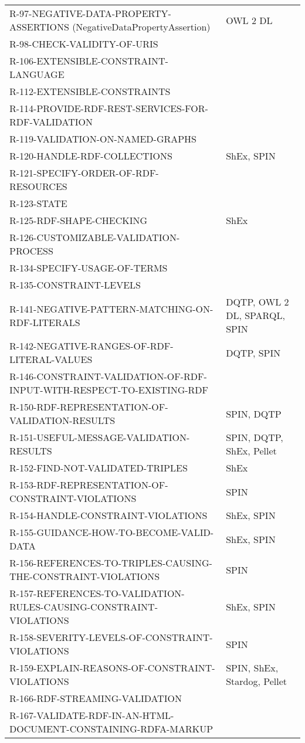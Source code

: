\documentclass{llncs}
\begin{document}
\begin{table}
\begin{tabular}{ll}
R-97-NEGATIVE-DATA-PROPERTY-ASSERTIONS (NegativeDataPropertyAssertion) & OWL 2 DL \\
R-98-CHECK-VALIDITY-OF-URIS & \\
R-106-EXTENSIBLE-CONSTRAINT-LANGUAGE & \\
R-112-EXTENSIBLE-CONSTRAINTS & \\
R-114-PROVIDE-RDF-REST-SERVICES-FOR-RDF-VALIDATION & \\
R-119-VALIDATION-ON-NAMED-GRAPHS & \\
R-120-HANDLE-RDF-COLLECTIONS & ShEx, SPIN \\
R-121-SPECIFY-ORDER-OF-RDF-RESOURCES & \\
R-123-STATE & \\
R-125-RDF-SHAPE-CHECKING & ShEx \\
R-126-CUSTOMIZABLE-VALIDATION-PROCESS & \\
R-134-SPECIFY-USAGE-OF-TERMS & \\
R-135-CONSTRAINT-LEVELS & \\
R-141-NEGATIVE-PATTERN-MATCHING-ON-RDF-LITERALS & DQTP, OWL 2 DL, SPARQL, SPIN \\
R-142-NEGATIVE-RANGES-OF-RDF-LITERAL-VALUES & DQTP, SPIN \\
R-146-CONSTRAINT-VALIDATION-OF-RDF-INPUT-WITH-RESPECT-TO-EXISTING-RDF & \\
R-150-RDF-REPRESENTATION-OF-VALIDATION-RESULTS & SPIN, DQTP \\
R-151-USEFUL-MESSAGE-VALIDATION-RESULTS & SPIN, DQTP, ShEx, Pellet \\
R-152-FIND-NOT-VALIDATED-TRIPLES & ShEx \\
R-153-RDF-REPRESENTATION-OF-CONSTRAINT-VIOLATIONS & SPIN \\
R-154-HANDLE-CONSTRAINT-VIOLATIONS & ShEx, SPIN \\
R-155-GUIDANCE-HOW-TO-BECOME-VALID-DATA & ShEx, SPIN \\
R-156-REFERENCES-TO-TRIPLES-CAUSING-THE-CONSTRAINT-VIOLATIONS & SPIN \\
R-157-REFERENCES-TO-VALIDATION-RULES-CAUSING-CONSTRAINT-VIOLATIONS & ShEx, SPIN \\
R-158-SEVERITY-LEVELS-OF-CONSTRAINT-VIOLATIONS & SPIN \\
R-159-EXPLAIN-REASONS-OF-CONSTRAINT-VIOLATIONS & SPIN, ShEx, Stardog, Pellet \\
R-166-RDF-STREAMING-VALIDATION & \\
R-167-VALIDATE-RDF-IN-AN-HTML-DOCUMENT-CONSTAINING-RDFA-MARKUP & \\

\end{tabular}
\end{table}
\end{document}

